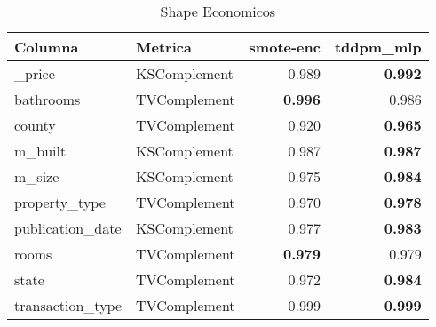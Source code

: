 \begin{table}[H]
\centering
\caption{Shape Economicos}
\label{table-shape-economicos-a-1}
\begin{tabular}{|l|l|r|r|}
\hline
\rowcolor[gray]{0.8}
Columna & Metrica & smote-enc & tddpm\_mlp \\
\hline \_price & KSComplement & 0.989 & \bfseries 0.992 \\
\hline bathrooms & TVComplement & \bfseries 0.996 & 0.986 \\
\hline county & TVComplement & 0.920 & \bfseries 0.965 \\
\hline m\_built & KSComplement & 0.987 & \bfseries 0.987 \\
\hline m\_size & KSComplement & 0.975 & \bfseries 0.984 \\
\hline property\_type & TVComplement & 0.970 & \bfseries 0.978 \\
\hline publication\_date & KSComplement & 0.977 & \bfseries 0.983 \\
\hline rooms & TVComplement & \bfseries 0.979 & 0.979 \\
\hline state & TVComplement & 0.972 & \bfseries 0.984 \\
\hline transaction\_type & TVComplement & 0.999 & \bfseries 0.999 \\
\hline
\end{tabular}
\end{table}
